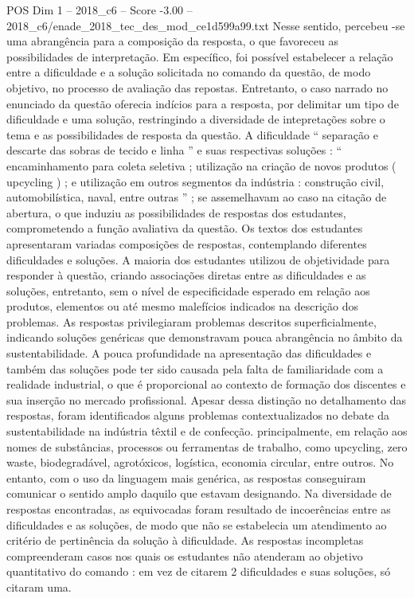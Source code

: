 \begin{textsample}{POS Dim 1 – 2018\_c6 – Score -3.00 – 2018\_c6/enade\_2018\_tec\_des\_mod\_ce1d599a99.txt}
Nesse sentido, percebeu -se uma abrangência para a composição da resposta, o que favoreceu as possibilidades de interpretação.
Em específico, foi possível estabelecer a relação entre a dificuldade e a solução solicitada no comando da questão, de modo objetivo, no processo de avaliação das repostas.
Entretanto, o caso narrado no enunciado da questão oferecia indícios para a resposta, por delimitar um tipo de dificuldade e uma solução, restringindo a diversidade de intepretações sobre o tema e as possibilidades de resposta da questão.
A dificuldade “ separação e descarte das sobras de tecido e linha ” e suas respectivas soluções : “ encaminhamento para coleta seletiva ; utilização na criação de novos produtos ( upcycling ) ; e utilização em outros segmentos da indústria : construção civil, automobilística, naval, entre outras ” ; se assemelhavam ao caso na citação de abertura, o que induziu as possibilidades de respostas dos estudantes, comprometendo a função avaliativa da questão.
Os textos dos estudantes apresentaram variadas composições de respostas, contemplando diferentes dificuldades e soluções.
A maioria dos estudantes utilizou de objetividade para responder à questão, criando associações diretas entre as dificuldades e as soluções, entretanto, sem o nível de especificidade esperado em relação aos produtos, elementos ou até mesmo malefícios indicados na descrição dos problemas.
As respostas privilegiaram problemas descritos superficialmente, indicando soluções genéricas que demonstravam pouca abrangência no âmbito da sustentabilidade.
A pouca profundidade na apresentação das dificuldades e também das soluções pode ter sido causada pela falta de familiaridade com a realidade industrial, o que é proporcional ao contexto de formação dos discentes e sua inserção no mercado profissional.
Apesar dessa distinção no detalhamento das respostas, foram identificados alguns problemas contextualizados no debate da sustentabilidade na indústria têxtil e de confecção. principalmente, em relação aos nomes de substâncias, processos ou ferramentas de trabalho, como upcycling, zero waste, biodegradável, agrotóxicos, logística, economia circular, entre outros.
No entanto, com o uso da linguagem mais genérica, as respostas conseguiram comunicar o sentido amplo daquilo que estavam designando.
Na diversidade de respostas encontradas, as equivocadas foram resultado de incoerências entre as dificuldades e as soluções, de modo que não se estabelecia um atendimento ao critério de pertinência da solução à dificuldade.
As respostas incompletas compreenderam casos nos quais os estudantes não atenderam ao objetivo quantitativo do comando : em vez de citarem 2 dificuldades e suas soluções, só citaram uma.

\end{textsample}
